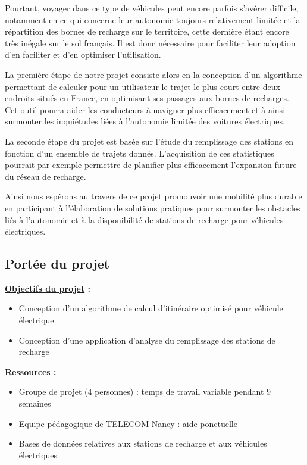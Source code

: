 \documentclass[a4paper, 12pt]{report}
\begin{document}
Pourtant, voyager dans ce type de véhicules peut encore parfois s'avérer difficile, notamment en ce qui concerne leur autonomie toujours relativement limitée et la répartition des bornes de recharge sur le territoire, cette dernière étant encore très inégale sur le sol français. Il est donc nécessaire pour faciliter leur adoption d'en faciliter et d'en optimiser l'utilisation.
\bigskip

La première étape de notre projet consiste alors en la conception d'un algorithme permettant de calculer pour un utilisateur le trajet le plus court entre deux endroits situés en France, en optimisant ses passages aux bornes de recharges. Cet outil pourra aider les conducteurs à naviguer plus efficacement et à ainsi surmonter les inquiétudes liées à l'autonomie limitée des voitures électriques.
\bigskip

La seconde étape du projet est basée sur l'étude du remplissage des stations en fonction d'un ensemble de trajets donnés. L'acquisition de ces statistiques pourrait par exemple permettre de planifier plus efficacement l'expansion future du réseau de recharge.
\bigskip

Ainsi nous espérons au travers de ce projet promouvoir une mobilité plus durable en participant à l'élaboration de solutions pratiques pour surmonter les obstacles liés à l'autonomie et à la disponibilité de stations de recharge pour véhicules électriques.
\bigskip

\subsection{Portée du projet}

\textbf{\underline{Objectifs du projet} :}
\begin{itemize}
    \item Conception d'un algorithme de calcul d'itinéraire optimisé pour véhicule électrique
    \item Conception d'une application d'analyse du remplissage des stations de recharge
\end{itemize}
\bigskip

\textbf{\underline{Ressources} :}
\begin{itemize}
    \item Groupe de projet (4 personnes) : temps de travail variable pendant 9 semaines
    \item Equipe pédagogique de TELECOM Nancy : aide ponctuelle
    \item Bases de données relatives aux stations de recharge et aux véhicules électriques
\end{itemize}
\clearpage
\end{document}
